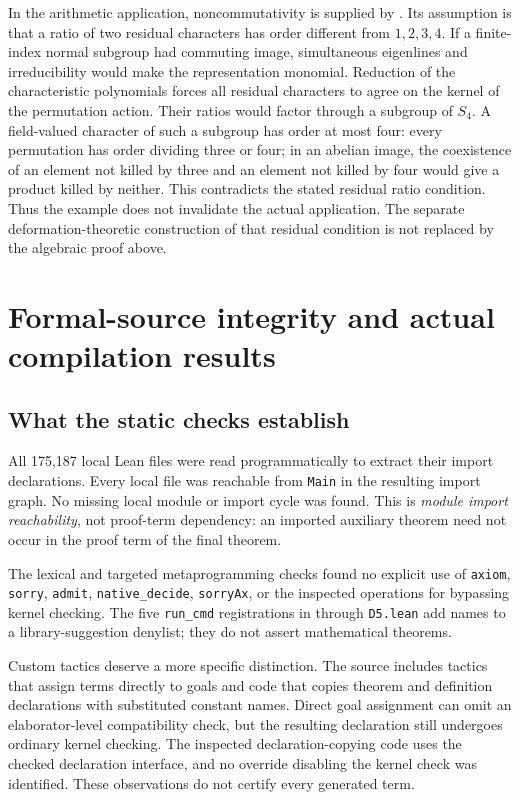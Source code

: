 \documentclass[11pt,a4paper]{article}
\theoremstyle{remark}
\newcommand{\src}[1]{\cite{#1}}
\newcommand{\code}[1]{\texttt{#1}}
\begin{document}
In the arithmetic application, noncommutativity is supplied by
. Its assumption is that a
ratio of two residual characters has order different from $1,2,3,4$.
If a finite-index normal subgroup had commuting image, simultaneous
eigenlines and irreducibility would make the representation monomial.
Reduction of the characteristic polynomials forces all residual
characters to agree on the kernel of the permutation action.
Their ratios would factor through a subgroup of $S_4$. A field-valued
character of such a subgroup has order at most four: every
permutation has order dividing three or four; in an abelian image,
the coexistence of an element not killed by three and an element
not killed by four would give a product killed by neither.
This contradicts the stated residual ratio condition.
Thus the example does not invalidate the actual application.
The separate deformation-theoretic construction of that residual
condition is not replaced by the algebraic proof above.

\src{S-regfour,milne-ag}

\section{Formal-source integrity and actual compilation results}\label{sec:formal}
\subsection{What the static checks establish}
All 175,187 local Lean files were read programmatically to extract their import declarations. Every local file was reachable from \code{Main} in the resulting import graph. No missing local module or import cycle was found. This is \emph{module import reachability}, not proof-term dependency: an imported auxiliary theorem need not occur in the proof term of the final theorem.

The lexical and targeted metaprogramming checks found no explicit use of
\code{axiom}, \code{sorry}, \code{admit}, \code{native\_decide},
\code{sorryAx}, or the inspected operations for bypassing kernel checking.
The five \code{run\_cmd} registrations in  through
\code{D5.lean} add names to a library-suggestion denylist; they do not assert mathematical theorems.

Custom tactics deserve a more specific distinction. The source includes tactics that assign terms directly to goals and code that copies theorem and definition declarations with substituted constant names. Direct goal assignment can omit an elaborator-level compatibility check, but the resulting declaration still undergoes ordinary kernel checking. The inspected declaration-copying code uses the checked declaration interface, and no override disabling the kernel check was identified. These observations do not certify every generated term. \src{S-meta}
\end{document}
